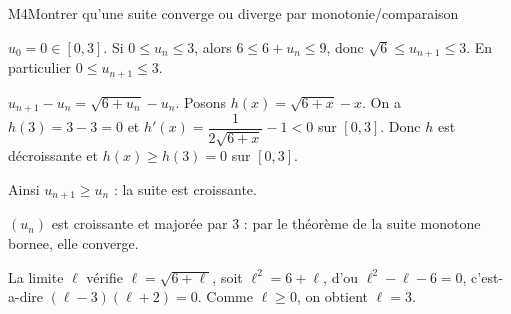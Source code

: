 \begin{fichemethode}{M4}{Montrer qu'une suite converge ou diverge par monotonie/comparaison}
{  $u_0 = 0 \in [0, 3]$. Si $0 \leq u_n \leq 3$, alors $6 \leq 6 + u_n \leq 9$, donc $\sqrt{6} \leq u_{n+1} \leq 3$. En particulier $0 \leq u_{n+1} \leq 3$.

  $u_{n+1} - u_n = \sqrt{6 + u_n} - u_n$. Posons $h(x) = \sqrt{6+x} - x$. On a $h(3) = 3 - 3 = 0$ et $h'(x) = \dfrac{1}{2\sqrt{6+x}} - 1 < 0$ sur $[0, 3]$. Donc $h$ est décroissante et $h(x) \geq h(3) = 0$ sur $[0, 3]$.

  Ainsi $u_{n+1} \geq u_n$ : la suite est croissante.

  $(u_n)$ est croissante et majorée par $3$ : par le théorème de la suite monotone bornee, elle converge.

  La limite $\ell$ vérifie $\ell = \sqrt{6 + \ell}$, soit $\ell^2 = 6 + \ell$, d'ou $\ell^2 - \ell - 6 = 0$, c'est-a-dire $(\ell - 3)(\ell + 2) = 0$. Comme $\ell \geq 0$, on obtient $\ell = 3$.
}




\end{fichemethode}
